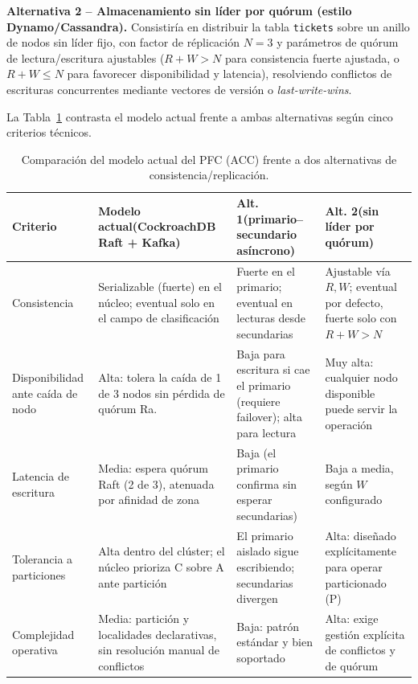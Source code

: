 \documentclass[11pt,a4paper]{article}
\begin{document}
\textbf{Alternativa 2 -- Almacenamiento sin l\'ider por qu\'orum (estilo Dynamo/Cassandra).}
Consistir\'ia en distribuir la tabla \texttt{tickets} sobre un anillo de nodos sin l\'ider fijo,
con factor de r\'eplicaci\'on $N=3$ y par\'ametros de qu\'orum de lectura/escritura ajustables
($R+W>N$ para consistencia fuerte ajustada, o $R+W\le N$ para favorecer disponibilidad y
latencia), resolviendo conflictos de escrituras concurrentes mediante vectores de versi\'on o
\emph{last-write-wins}.

La Tabla~\ref{tab:comparativa} contrasta el modelo actual frente a ambas alternativas seg\'un cinco
criterios t\'ecnicos.

\begin{table}[ht]
\centering
\small
\caption{Comparaci\'on del modelo actual del PFC (ACC) frente a dos alternativas de
consistencia/replicaci\'on.}
\label{tab:comparativa}
\begin{tabular}{@{}p{2.6cm}p{3.7cm}p{3.7cm}p{3.7cm}@{}}
\toprule
\textbf{Criterio} & \textbf{Modelo actual}\newline(CockroachDB Raft + Kafka) & \textbf{Alt. 1}\newline(primario--secundario as\'incrono) & \textbf{Alt. 2}\newline(sin l\'ider por qu\'orum) \\
\midrule
Consistencia &
Serializable (fuerte) en el n\'ucleo; eventual solo en el campo de clasificaci\'on &
Fuerte en el primario; eventual en lecturas desde secundarias &
Ajustable v\'ia $R,W$; eventual por defecto, fuerte solo con $R+W>N$ \\
\addlinespace
Disponibilidad ante ca\'ida de nodo &
Alta: tolera la ca\'ida de 1 de 3 nodos sin p\'erdida de qu\'orum Ra. &
Baja para escritura si cae el primario (requiere failover); alta para lectura &
Muy alta: cualquier nodo disponible puede servir la operaci\'on \\
\addlinespace
Latencia de escritura &
Media: espera qu\'orum Raft (2 de 3), atenuada por afinidad de zona &
Baja (el primario confirma sin esperar secundarias) &
Baja a media, seg\'un $W$ configurado \\
\addlinespace
Tolerancia a particiones &
Alta dentro del cl\'uster; el n\'ucleo prioriza C sobre A ante partici\'on &
El primario aislado sigue escribiendo; secundarias divergen &
Alta: dise\~nado expl\'icitamente para operar particionado (P) \\
\addlinespace
Complejidad operativa &
Media: partici\'on y localidades declarativas, sin resoluci\'on manual de conflictos &
Baja: patr\'on est\'andar y bien soportado &
Alta: exige gesti\'on expl\'icita de conflictos y de qu\'orum \\
\bottomrule
\end{tabular}
\end{table}
\end{document}
